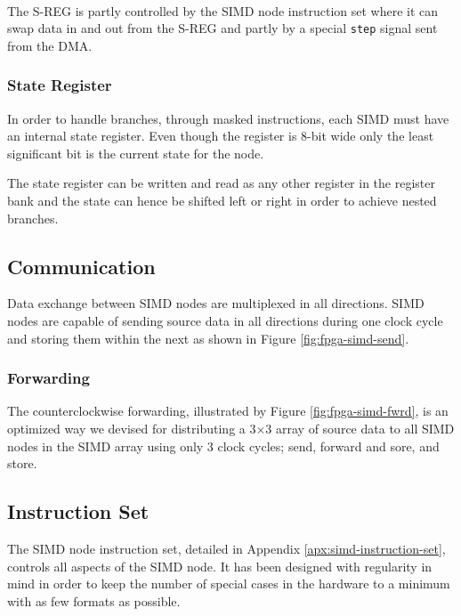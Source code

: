  

The \ac{S-REG} is partly controlled by the \ac{SIMD} node instruction set where it
can swap data in and out from the \ac{S-REG} and partly by a special {\tt step} signal
sent from the \ac{DMA}.

\subsubsection{State Register}
In order to handle branches, through masked instructions, each \ac{SIMD} must have an
internal state register. Even though the register is 8-bit wide only the least 
significant bit is the current state for the node.

The state register can be written and read as any other register in the register
bank and the state can hence be shifted left or right in order to achieve nested
branches.

\subsection{Communication}\label{sec:simd-com}

Data exchange between \ac{SIMD} nodes are multiplexed in all directions. \ac{SIMD} nodes
are capable of sending source data in all directions during one clock cycle and storing
them within the next as shown in Figure \ref{fig:fpga-simd-send}.



\subsubsection{Forwarding}
The counterclockwise forwarding, illustrated by Figure \ref{fig:fpga-simd-fwrd}, is an 
optimized way we devised for distributing a 3$\times$3 array of source data to all 
\ac{SIMD} nodes in the \ac{SIMD} array using only 3 clock cycles; send, forward and sore, 
and store.




\subsection{Instruction Set}
The \ac{SIMD} node instruction set, detailed in Appendix \ref{apx:simd-instruction-set}, 
controls all aspects of the \ac{SIMD} node. It has been designed with regularity in mind 
in order to keep the number of special cases in the hardware to a minimum with as few 
formats as possible.

